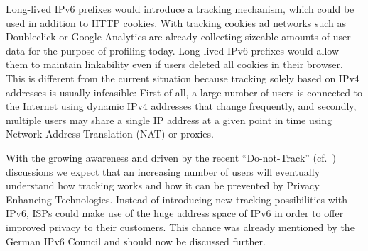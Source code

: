 \documentclass{easychair}
\begin{document}
Long-lived IPv6 prefixes would introduce a tracking mechanism, which could be used in addition to HTTP cookies. With tracking cookies ad networks such as Doubleclick or Google Analytics are already collecting sizeable amounts of user data for the purpose of profiling today. Long-lived IPv6 prefixes would allow them to maintain linkability even if users deleted all cookies in their browser. This is different from the current situation because tracking solely based on IPv4 addresses is usually infeasible: First of all, a large number of users is connected to the Internet using dynamic IPv4 addresses that change frequently, and secondly, multiple users may share a single IP address at a given point in time using Network Address Translation (NAT) or proxies.

With the growing awareness and driven by the recent ``Do-not-Track'' (cf.~\cite{dnt2011}) discussions we expect that an increasing number of users will eventually understand how tracking works and how it can be prevented by Privacy Enhancing Technologies. Instead of introducing new tracking possibilities with IPv6, ISPs could make use of the huge address space of IPv6 in order to offer improved privacy to their customers. This chance was already mentioned by the German IPv6 Council \cite{leitlinien-IPv6} and should now be discussed further.
\end{document}
